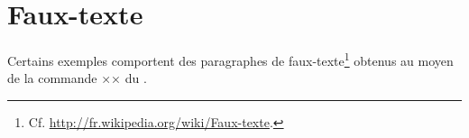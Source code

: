 \section{Faux-texte}
\label{sec:faux-texte}

Certains exemples comportent des paragraphes de faux-texte\footnote{Cf.
  \url{http://fr.wikipedia.org/wiki/Faux-texte}.} obtenus au moyen de la
commande ×\lipsum× du .

%
\iffalse
\fi
